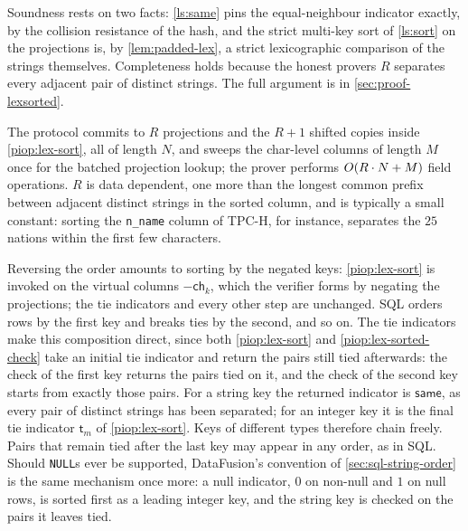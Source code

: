 Soundness rests on two facts: \cref{ls:same} pins the equal-neighbour indicator exactly, by the collision resistance of the hash, and the strict multi-key sort of \cref{ls:sort} on the projections is, by \cref{lem:padded-lex}, a strict lexicographic comparison of the strings themselves. Completeness holds because the honest prover\textquotesingle s $R$ separates every adjacent pair of distinct strings. The full argument is in \cref{sec:proof-lexsorted}.

The protocol commits to $R$ projections and the $R + 1$ shifted copies inside \cref{piop:lex-sort}, all of length $N$, and sweeps the char-level columns of length $M$ once for the batched projection lookup; the prover performs $O(R \cdot N + M)$ field operations. $R$ is data dependent, one more than the longest common prefix between adjacent distinct strings in the sorted column, and is typically a small constant: sorting the \texttt{n\_name} column of TPC-H, for instance, separates the $25$ nations within the first few characters.

Reversing the order amounts to sorting by the negated keys: \cref{piop:lex-sort} is invoked on the virtual columns $-\mathsf{ch}_k$, which the verifier forms by negating the projections; the tie indicators and every other step are unchanged. SQL orders rows by the first key and breaks ties by the second, and so on. The tie indicators make this composition direct, since both \cref{piop:lex-sort} and \cref{piop:lex-sorted-check} take an initial tie indicator and return the pairs still tied afterwards: the check of the first key returns the pairs tied on it, and the check of the second key starts from exactly those pairs. For a string key the returned indicator is $\mathsf{same}$, as every pair of distinct strings has been separated; for an integer key it is the final tie indicator $\mathsf{t}_m$ of \cref{piop:lex-sort}. Keys of different types therefore chain freely. Pairs that remain tied after the last key may appear in any order, as in SQL. Should \texttt{NULL}s ever be supported, DataFusion's convention of \cref{sec:sql-string-order} is the same mechanism once more: a null indicator, $0$ on non-null and $1$ on null rows, is sorted first as a leading integer key, and the string key is checked on the pairs it leaves tied.

